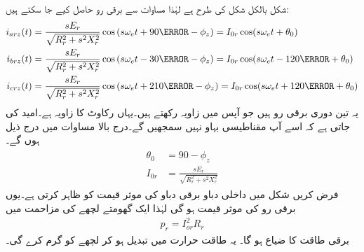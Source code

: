 شکل  بالکل شکل   کی طرح ہے لہٰذا مساوات   سے برقی رو حاصل کیے جا سکتے ہیں:
\begin{gather}
\begin{aligned}
i_{arz}(t)&=\frac{s E_r}{\sqrt{R_r^2+s^2 X_r^2}} \cos \left(s \omega_e t +90\degree-\phi_z \right)=I_{0r} \cos (s \omega_e t +\theta_0)\\
i_{brz}(t)&=\frac{s E_r}{\sqrt{R_r^2+s^2 X_r^2}} \cos \left(s \omega_e t -30\degree-\phi_z \right)=I_{0r} \cos (s \omega_e t -120 \degree+\theta_0)\\
i_{crz}(t)&=\frac{s E_r}{\sqrt{R_r^2+s^2 X_r^2}} \cos \left(s \omega_e t +210\degree-\phi_z \right)=I_{0r} \cos (s \omega_e t+120\degree +\theta_0)
\end{aligned}
\end{gather}
یہ تین دوری برقی رو ہیں جو آپس میں   زاویہ رکھتے ہیں۔یہاں  رکاوٹ کا زاویہ ہے۔امید کی جاتی ہے کہ اسے آپ مقناطیسی بہاو نہیں سمجھیں گے۔درج بالا مساوات میں درج ذیل ہوں گے۔
\begin{gather}
\begin{aligned}\label{مساوات_امالی_گھومتا_رو}
\theta_0&=90-\phi_z \\
I_{0r}&=\frac{s E_r}{\sqrt{R_r^2+s^2 X_r^2}}
\end{aligned}
\end{gather}
فرض کریں شکل  میں داخلی دباو  برقی دباو کی موثر قیمت کو ظاہر کرتی ہے۔یوں  برقی رو کی موثر قیمت ہو گی لہٰذا ایک گھومتے لچھے کی مزاحمت میں 
\begin{align}\label{مساوات_امالی_طاقت_ضیاع_گھمتا_حصہ}
p_r =I_{or}^2 R_r
\end{align}
برقی طاقت کا ضیاع ہو گا۔  یہ طاقت حرارت میں تبدیل ہو کر  لچھے کو گرم کرے گی۔

